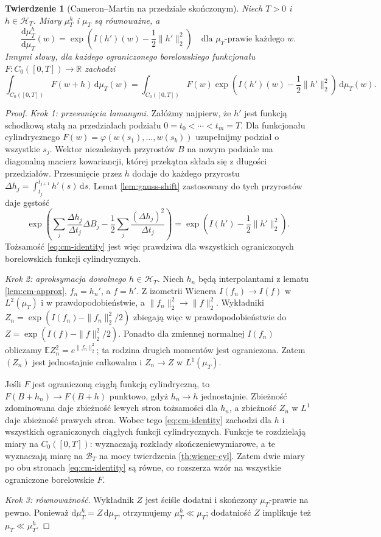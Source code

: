\documentclass[11pt,a4paper,oneside]{report}
\numberwithin{equation}{chapter}
\theoremstyle{plain}
\newtheorem{twierdzenie}{Twierdzenie}[chapter]
\theoremstyle{definition}
\theoremstyle{remark}
\newcommand{\R}{\mathbb{R}}
\newcommand{\E}{\mathbb{E}}
\newcommand{\calH}{\mathcal{H}}
\newcommand{\dd}{\mathrm{d}}
\begin{document}
\begin{twierdzenie}[Cameron--Martin na przedziale skończonym]\label{thm:volIII:09:04}
\label{th:cameron-martin}
Niech $T>0$ i $h\in\calH_T$.
Miary $\mu_T^h$ i $\mu_T$ są równoważne, a
\[
\frac{\dd\mu_T^h}{\dd\mu_T}(w)
=\exp\left(I(h')(w)-\frac12\|h'\|_2^2\right)
\quad\text{dla }\mu_T\text{-prawie każdego }w.
\tag{9.1}\label{eq:cm-density}
\]
Innymi słowy, dla każdego ograniczonego borelowskiego
funkcjonału $F:C_0([0,T])\to\R$ zachodzi
\[
\int_{C_0([0,T])} F(w+h)\,\dd\mu_T(w)
=\int_{C_0([0,T])} F(w)\exp\left(I(h')(w)-\frac12\|h'\|_2^2\right)
\,\dd\mu_T(w).
\tag{9.2}\label{eq:cm-identity}
\]
\end{twierdzenie}
\begin{proof}
\emph{Krok 1: przesunięcia łamanymi.} Załóżmy najpierw, że
$h'$ jest funkcją schodkową stałą na przedziałach podziału
$0=t_0<\cdots<t_m=T$. Dla funkcjonału cylindrycznego
$F(w)=\varphi(w(s_1),\ldots,w(s_k))$ uzupełnijmy podział
o wszystkie $s_j$. Wektor niezależnych przyrostów $B$ na
nowym podziale ma diagonalną macierz kowariancji, której
przekątna składa się z długości przedziałów.
Przesunięcie przez $h$ dodaje do każdego przyrostu
$\Delta h_j=\int_{t_j}^{t_{j+1}}h'(s)\,\dd s$.
Lemat \ref{lem:gauss-shift} zastosowany do tych przyrostów
daje gęstość
\[
\exp\left(\sum_j\frac{\Delta h_j}{\Delta t_j}\Delta B_j
 -\frac12\sum_j\frac{(\Delta h_j)^2}{\Delta t_j}\right)
=\exp\left(I(h')-\frac12\|h'\|_2^2\right).
\]
Tożsamość \eqref{eq:cm-identity} jest więc prawdziwa dla
wszystkich ograniczonych borelowskich funkcji cylindrycznych.

\emph{Krok 2: aproksymacja dowolnego $h\in\calH_T$.}
Niech $h_n$ będą interpolantami z lematu \ref{lem:cm-approx},
$f_n=h_n'$, a $f=h'$. Z izometrii Wienera
$I(f_n)\to I(f)$ w $L^2(\mu_T)$ i w prawdopodobieństwie,
a $\|f_n\|_2^2\to\|f\|_2^2$. Wykładniki
$Z_n=\exp(I(f_n)-\|f_n\|_2^2/2)$ zbiegają więc
w prawdopodobieństwie do
$Z=\exp(I(f)-\|f\|_2^2/2)$.
Ponadto dla zmiennej normalnej $I(f_n)$ obliczamy
$\E Z_n^2=e^{\|f_n\|_2^2}$; ta rodzina drugich
momentów jest ograniczona. Zatem $(Z_n)$ jest jednostajnie
całkowalna i $Z_n\to Z$ w $L^1(\mu_T)$.

Jeśli $F$ jest ograniczoną ciągłą funkcją cylindryczną,
to $F(B+h_n)\to F(B+h)$ punktowo, gdyż $h_n\to h$
jednostajnie. Zbieżność zdominowana daje zbieżność
lewych stron tożsamości dla $h_n$, a zbieżność $Z_n$
w $L^1$ daje zbieżność prawych stron.
Wobec tego \eqref{eq:cm-identity} zachodzi dla $h$ i
wszystkich ograniczonych ciągłych funkcji cylindrycznych.
Funkcje te rozdzielają miary na $C_0([0,T])$:
wyznaczają rozkłady skończeniewymiarowe, a te wyznaczają
miarę na $\mathcal B_T$ na mocy twierdzenia \ref{th:wiener-cyl}.
Zatem dwie miary po obu stronach \eqref{eq:cm-identity}
są równe, co rozszerza wzór na wszystkie ograniczone
borelowskie $F$.

\emph{Krok 3: równoważność.} Wykładnik $Z$ jest ściśle
dodatni i skończony $\mu_T$-prawie na pewno.
Ponieważ $\dd\mu_T^h=Z\,\dd\mu_T$, otrzymujemy
$\mu_T^h\ll\mu_T$; dodatniość $Z$ implikuje też
$\mu_T\ll\mu_T^h$.
\end{proof}
\end{document}
